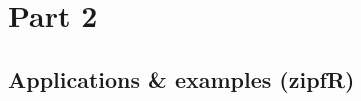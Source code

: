\documentclass[t]{beamer} %
\begin{document}

\begin{frame}[c]
  \begin{center}
  \end{center}
\end{frame}
\hideLogo{}


\section{Part 2}


\subsection{Applications \& examples (zipfR)}
\end{document}
